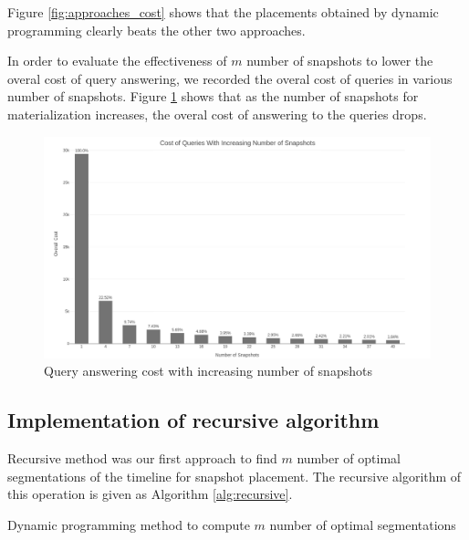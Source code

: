 			Figure \ref{fig:approaches_cost} shows that the placements obtained by dynamic programming clearly beats the other two approaches.

			In order to evaluate the effectiveness of $m$ number of snapshots to lower the overal cost of query answering, we recorded the overal cost of queries in various number of snapshots. Figure \ref{fig:snapshots_cost} shows that as the number of snapshots for materialization increases, the overal cost of answering to the queries drops.

			\begin{figure}
				\centering
				\includegraphics[width=\textwidth]{figs/various_snapshot.jpg}
				\caption{Query answering cost with increasing number of snapshots}
				\label{fig:snapshots_cost}
			\end{figure} 

		\subsection{Implementation of recursive algorithm} \label{sec:recursive_implementation}
			Recursive method was our first approach to find $m$ number of optimal segmentations of the timeline for snapshot placement. The recursive algorithm of this operation is given as Algorithm \ref{alg:recursive}.

			\begin{algorithm}
				\SetAlgoLined
				\caption{Dynamic programming method to compute $m$ number of optimal segmentations}
				\SetAlCapNameFnt{\tiny}
				\label{alg:recursive}
				\DontPrintSemicolon
			\end{algorithm}

